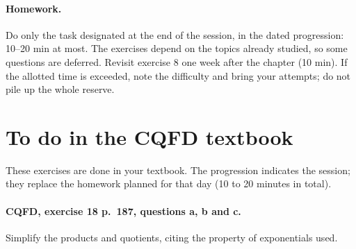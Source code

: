 \paragraph{Homework.} Do only the task designated at the end of the session, in the dated progression: 10--20 min at most. The exercises depend on the topics already studied, so some questions are deferred. Revisit exercise 8 one week after the chapter (10 min). If the allotted time is exceeded, note the difficulty and bring your attempts; do not pile up the whole reserve.
\endgroup
{}\section*{To do in the CQFD textbook}
These exercises are done in your textbook. The progression indicates the session; they replace the homework planned for that day (10 to 20 minutes in total).
\paragraph{CQFD, exercise 18 p.~187, questions a, b and c.}\label{C09-M1} Simplify the products and quotients, citing the property of exponentials used.
